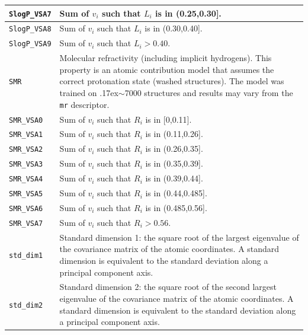 \documentclass[12pt,a4paper]{article}
\begin{document}
\begin{longtable}{@{\zz}|p{}|p{}|}
\texttt{SlogP\_VSA7} & Sum of $v_i$ such that $L_i$ is in (0.25,0.30].\\ \hline

\texttt{SlogP\_VSA8} & Sum of $v_i$ such that $L_i$ is in (0.30,0.40].\\ \hline

\texttt{SlogP\_VSA9} & Sum of $v_i$ such that $L_i > 0.40$.\\ \hline

\texttt{SMR} & Molecular refractivity (including implicit hydrogens). This 
property is an atomic contribution model \cite{Wildman1999} that assumes 
the correct protonation state (washed structures). The model was trained 
on {\raise.17ex\hbox{$\scriptstyle\sim$}}7000 structures and results may 
vary from the \texttt{mr} descriptor.\\ \hline

\texttt{SMR\_VSA0} & Sum of $v_i$ such that $R_i$ is in [0,0.11].\\ \hline

\texttt{SMR\_VSA1} & Sum of $v_i$ such that $R_i$ is in (0.11,0.26].\\ \hline

\texttt{SMR\_VSA2} & Sum of $v_i$ such that $R_i$ is in (0.26,0.35].\\ \hline

\texttt{SMR\_VSA3} & Sum of $v_i$ such that $R_i$ is in (0.35,0.39].\\ \hline

\texttt{SMR\_VSA4} & Sum of $v_i$ such that $R_i$ is in (0.39,0.44].\\ \hline

\texttt{SMR\_VSA5} & Sum of $v_i$ such that $R_i$ is in (0.44,0.485].\\ \hline

\texttt{SMR\_VSA6} & Sum of $v_i$ such that $R_i$ is in (0.485,0.56].\\ \hline

\texttt{SMR\_VSA7} & Sum of $v_i$ such that $R_i > 0.56$.\\ \hline

\texttt{std\_dim1} & Standard dimension 1: the square root of the largest 
eigenvalue of the covariance matrix of the atomic coordinates. A standard 
dimension is equivalent to the standard deviation along a principal 
component axis.\\ \hline

\texttt{std\_dim2} & Standard dimension 2: the square root of the second 
largest eigenvalue of the covariance matrix of the atomic coordinates. 
A standard dimension is equivalent to the standard deviation along a 
principal component axis.\\ \hline


\end{longtable}
\end{document}
